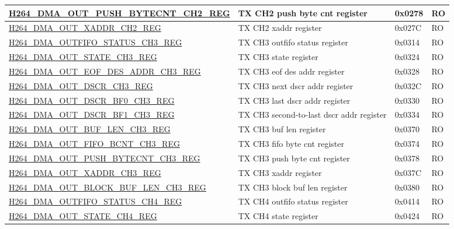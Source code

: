 \begin{longtable}{ | p{7.5cm} | p{5.7cm} | p{1.2cm} | p{1.5cm} | }
\hyperref[regdesc:H264DMAOUTPUSHBYTECNTCH2REG]{H264\_DMA\_OUT\_PUSH\_BYTECNT\_CH2\_REG} & TX CH2 push byte cnt register & 0x0278 & RO \\ \hline
\hyperref[regdesc:H264DMAOUTXADDRCH2REG]{H264\_DMA\_OUT\_XADDR\_CH2\_REG} & TX CH2 xaddr register & 0x027C & RO \\ \hline
\hyperref[regdesc:H264DMAOUTFIFOSTATUSCH3REG]{H264\_DMA\_OUTFIFO\_STATUS\_CH3\_REG} & TX CH3 outfifo status register & 0x0314 & RO \\ \hline
\hyperref[regdesc:H264DMAOUTSTATECH3REG]{H264\_DMA\_OUT\_STATE\_CH3\_REG} & TX CH3 state register & 0x0324 & RO \\ \hline
\hyperref[regdesc:H264DMAOUTEOFDESADDRCH3REG]{H264\_DMA\_OUT\_EOF\_DES\_ADDR\_CH3\_REG} & TX CH3 eof des addr register & 0x0328 & RO \\ \hline
\hyperref[regdesc:H264DMAOUTDSCRCH3REG]{H264\_DMA\_OUT\_DSCR\_CH3\_REG} & TX CH3 next dscr addr register & 0x032C & RO \\ \hline
\hyperref[regdesc:H264DMAOUTDSCRBF0CH3REG]{H264\_DMA\_OUT\_DSCR\_BF0\_CH3\_REG} & TX CH3 last dscr addr register & 0x0330 & RO \\ \hline
\hyperref[regdesc:H264DMAOUTDSCRBF1CH3REG]{H264\_DMA\_OUT\_DSCR\_BF1\_CH3\_REG} & TX CH3 second-to-last dscr addr register & 0x0334 & RO \\ \hline
\hyperref[regdesc:H264DMAOUTBUFLENCH3REG]{H264\_DMA\_OUT\_BUF\_LEN\_CH3\_REG} & TX CH3 buf len register & 0x0370 & RO \\ \hline
\hyperref[regdesc:H264DMAOUTFIFOBCNTCH3REG]{H264\_DMA\_OUT\_FIFO\_BCNT\_CH3\_REG} & TX CH3 fifo byte cnt register & 0x0374 & RO \\ \hline
\hyperref[regdesc:H264DMAOUTPUSHBYTECNTCH3REG]{H264\_DMA\_OUT\_PUSH\_BYTECNT\_CH3\_REG} & TX CH3 push byte cnt register & 0x0378 & RO \\ \hline
\hyperref[regdesc:H264DMAOUTXADDRCH3REG]{H264\_DMA\_OUT\_XADDR\_CH3\_REG} & TX CH3 xaddr register & 0x037C & RO \\ \hline
\hyperref[regdesc:H264DMAOUTBLOCKBUFLENCH3REG]{H264\_DMA\_OUT\_BLOCK\_BUF\_LEN\_CH3\_REG} & TX CH3 block buf len register & 0x0380 & RO \\ \hline
\hyperref[regdesc:H264DMAOUTFIFOSTATUSCH4REG]{H264\_DMA\_OUTFIFO\_STATUS\_CH4\_REG} & TX CH4 outfifo status register & 0x0414 & RO \\ \hline
\hyperref[regdesc:H264DMAOUTSTATECH4REG]{H264\_DMA\_OUT\_STATE\_CH4\_REG} & TX CH4 state register & 0x0424 & RO \\ \hline

\end{longtable}
